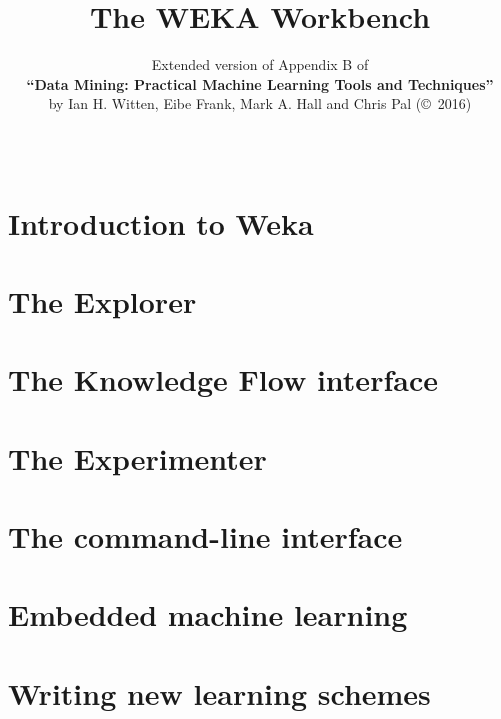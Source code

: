 \documentclass[a4paper]{book}
\title{{\Huge \hspace{2cm}The WEKA Workbench}}
\author{Extended version of Appendix B of\\{\bf ``Data Mining: Practical Machine Learning Tools and Techniques''}\\by Ian H. Witten, Eibe Frank, Mark A. Hall and Chris Pal (\copyright\ 2016)}
\date{ ~\vspace{1cm} \\\hspace{2cm}\epsfig{file=images/Book4thEd.jpg,width=6cm}}
\begin{document}
\begin{titlepage}
\maketitle

\end{titlepage}

\tableofcontents

\chapter{Introduction to Weka}


\chapter{The Explorer}
\label{chapt:explorer}


\chapter{The Knowledge Flow interface}
\label{chapt:knowledge_flow}


\chapter{The Experimenter}
\label{chapt:experimenter}


\chapter{The command-line interface}
\label{chapt:command_line}


\chapter{Embedded machine learning}
\label{chapt:embedded}


\chapter{Writing new learning schemes}
\label{chapt:writing_learning_schemes}

\end{document}
